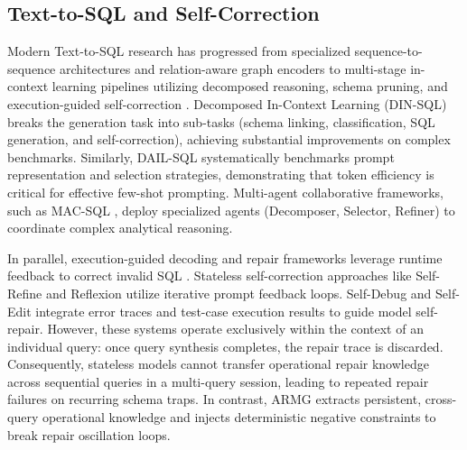 \documentclass[conference]{IEEEtran}
\begin{document}
\subsection{Text-to-SQL and Self-Correction}
Modern Text-to-SQL research has progressed from specialized sequence-to-sequence architectures and relation-aware graph encoders to multi-stage in-context learning pipelines utilizing decomposed reasoning, schema pruning, and execution-guided self-correction \cite{pourreza2023dinsql, gao2024dailsql, wang2025macsql, wang2018executionguided}. Decomposed In-Context Learning (DIN-SQL) \cite{pourreza2023dinsql} breaks the generation task into sub-tasks (schema linking, classification, SQL generation, and self-correction), achieving substantial improvements on complex benchmarks. Similarly, DAIL-SQL \cite{gao2024dailsql} systematically benchmarks prompt representation and selection strategies, demonstrating that token efficiency is critical for effective few-shot prompting. Multi-agent collaborative frameworks, such as MAC-SQL \cite{wang2025macsql}, deploy specialized agents (Decomposer, Selector, Refiner) to coordinate complex analytical reasoning.

In parallel, execution-guided decoding and repair frameworks leverage runtime feedback to correct invalid SQL \cite{madaan2023selfrefine, shinn2023reflexion, chen2024selfdebug, zhang2023selfedit, wang2018executionguided}. Stateless self-correction approaches like Self-Refine \cite{madaan2023selfrefine} and Reflexion \cite{shinn2023reflexion} utilize iterative prompt feedback loops. Self-Debug \cite{chen2024selfdebug} and Self-Edit \cite{zhang2023selfedit} integrate error traces and test-case execution results to guide model self-repair. However, these systems operate exclusively within the context of an individual query: once query synthesis completes, the repair trace is discarded. Consequently, stateless models cannot transfer operational repair knowledge across sequential queries in a multi-query session, leading to repeated repair failures on recurring schema traps. In contrast, ARMG extracts persistent, cross-query operational knowledge and injects deterministic negative constraints to break repair oscillation loops.
\end{document}
